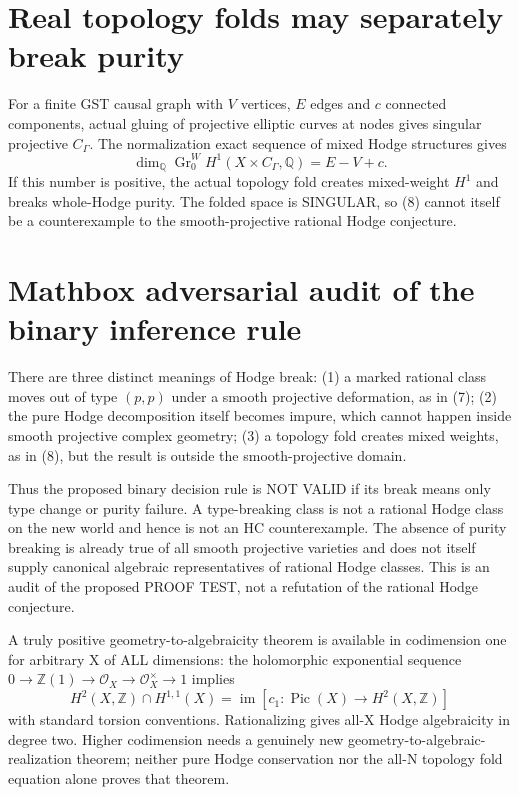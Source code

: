 \documentclass[11pt]{article}
\begin{document}
\section{Real topology folds may separately break purity}
For a finite GST causal graph with $V$ vertices, $E$ edges and
$c$ connected components, actual gluing of projective elliptic
curves at nodes gives singular projective $C_\Gamma$.
The normalization exact sequence of mixed Hodge structures gives
\[
 \dim_{\mathbb Q}\operatorname{Gr}_0^W H^1
      (X\times C_\Gamma,\mathbb Q)=E-V+c.                  \tag{8}
\]
If this number is positive, the actual topology fold creates
mixed-weight $H^1$ and breaks whole-Hodge purity.
The folded space is SINGULAR, so (8) cannot itself be a
counterexample to the smooth-projective rational Hodge conjecture.

\section{Mathbox adversarial audit of the binary inference rule}
There are three distinct meanings of Hodge break:
(1) a marked rational class moves out of type $(p,p)$
under a smooth projective deformation, as in (7);
(2) the pure Hodge decomposition itself becomes impure,
which cannot happen inside smooth projective complex geometry;
(3) a topology fold creates mixed weights, as in (8),
but the result is outside the smooth-projective domain.

Thus the proposed binary decision rule is NOT VALID
if its break means only type change or purity failure.
A type-breaking class is not a rational Hodge class on the
new world and hence is not an HC counterexample.
The absence of purity breaking is already true of all
smooth projective varieties and does not itself supply
canonical algebraic representatives of rational Hodge classes.
This is an audit of the proposed PROOF TEST,
not a refutation of the rational Hodge conjecture.

A truly positive geometry-to-algebraicity theorem is available
in codimension one for arbitrary X of ALL dimensions:
the holomorphic exponential sequence
$0\to\mathbb Z(1)\to\mathcal O_X
\to\mathcal O_X^\times\to1$ implies
\[
 H^2(X,\mathbb Z)\cap H^{1,1}(X)
  =\operatorname{im}[c_1:\operatorname{Pic}(X)
                         \to H^2(X,\mathbb Z)]              \tag{9}
\]
with standard torsion conventions. Rationalizing gives all-X
Hodge algebraicity in degree two. Higher codimension needs a
genuinely new geometry-to-algebraic-realization theorem;
neither pure Hodge conservation nor the all-N topology fold
equation alone proves that theorem.
\end{document}
